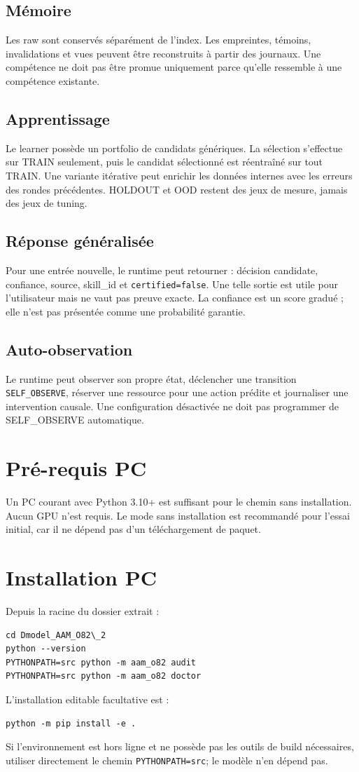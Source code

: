 \documentclass[11pt,a4paper]{report}
\begin{document}
\section{Mémoire}
Les raw sont conservés séparément de l'index. Les empreintes, témoins, invalidations et vues peuvent être reconstruits à partir des journaux. Une compétence ne doit pas être promue uniquement parce qu'elle ressemble à une compétence existante.

\section{Apprentissage}
Le learner possède un portfolio de candidats génériques. La sélection s'effectue sur TRAIN seulement, puis le candidat sélectionné est réentraîné sur tout TRAIN. Une variante itérative peut enrichir les données internes avec les erreurs des rondes précédentes. HOLDOUT et OOD restent des jeux de mesure, jamais des jeux de tuning.

\section{Réponse généralisée}
Pour une entrée nouvelle, le runtime peut retourner : décision candidate, confiance, source, skill\_id et \texttt{certified=false}. Une telle sortie est utile pour l'utilisateur mais ne vaut pas preuve exacte. La confiance est un score gradué ; elle n'est pas présentée comme une probabilité garantie.

\section{Auto-observation}
Le runtime peut observer son propre état, déclencher une transition \texttt{SELF\_OBSERVE}, réserver une ressource pour une action prédite et journaliser une intervention causale. Une configuration désactivée ne doit pas programmer de SELF\_OBSERVE automatique.

\chapter{Pré-requis PC}
Un PC courant avec Python 3.10+ est suffisant pour le chemin sans installation. Aucun GPU n'est requis. Le mode sans installation est recommandé pour l'essai initial, car il ne dépend pas d'un téléchargement de paquet.

\chapter{Installation PC}
Depuis la racine du dossier extrait :
\begin{verbatim}
cd Dmodel_AAM_O82\_2
python --version
PYTHONPATH=src python -m aam_o82 audit
PYTHONPATH=src python -m aam_o82 doctor
\end{verbatim}
L'installation editable facultative est :
\begin{verbatim}
python -m pip install -e .
\end{verbatim}
Si l'environnement est hors ligne et ne possède pas les outils de build nécessaires, utiliser directement le chemin \texttt{PYTHONPATH=src}; le modèle n'en dépend pas.
\end{document}
